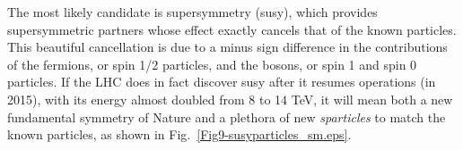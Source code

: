 \documentclass[12pt]{iopart}
\begin{document}
The most likely candidate is supersymmetry (susy), which provides supersymmetric partners whose effect exactly cancels that of the known particles. This beautiful cancellation is due to a minus sign difference in the contributions of the fermions, or spin 1/2 particles, and the bosons, or spin 1 and spin 0 particles. If the LHC does in fact discover susy after it resumes operations (in 2015), with its energy almost doubled from 8 to 14 TeV, it will mean both a new fundamental symmetry of Nature and a plethora of new \textit{sparticles} to match the known particles, as shown in Fig.~\ref{Fig9-susyparticles_sm.eps}.
\end{document}
